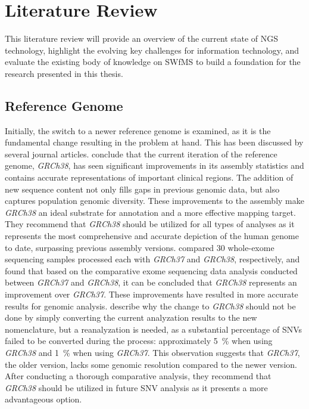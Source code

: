 \section{Literature Review}\label{sec:literature_review}

This literature review will provide an overview of the current state of \ac{NGS} technology, highlight the evolving key challenges for information technology, and evaluate the existing body of knowledge on \ac{SWfMS} to build a foundation for the research presented in this thesis.

\subsection{Reference Genome}
Initially, the switch to a newer reference genome is examined, as it is the fundamental change resulting in the problem at hand. This has been discussed by several journal articles. \citeauthor{Schneider2017} \autocite{Schneider2017} conclude that the current iteration of the reference genome, \textit{GRCh38}, has seen significant improvements in its assembly statistics and contains accurate representations of important clinical regions. The addition of new sequence content not only fills gaps in previous genomic data, but also captures population genomic diversity. These improvements to the assembly make \textit{GRCh38} an ideal substrate for annotation and a more effective mapping target. They recommend that \textit{GRCh38} should be utilized for all types of analyses as it represents the most comprehensive and accurate depiction of the human genome to date, surpassing previous assembly versions. \citeauthor{Guo2017} \autocite{Guo2017} compared 30 whole-exome sequencing samples processed each with \textit{GRCh37} and \textit{GRCh38}, respectively, and found that based on the comparative exome sequencing data analysis conducted between \textit{GRCh37} and \textit{GRCh38}, it can be concluded that \textit{GRCh38} represents an improvement over \textit{GRCh37}. These improvements have resulted in more accurate results for genomic analysis. \citeauthor{Pan2019} \autocite{Pan2019} describe why the change to \textit{GRCh38} should not be done by simply converting the current analyzation results to the new nomenclature, but a reanalyzation is needed, as a substantial percentage of \acp{SNV} failed to be converted during the process: approximately \SI{5}{\percent} when using \textit{GRCh38} and \SI{1}{\percent} when using \textit{GRCh37}. This observation suggests that \textit{GRCh37}, the older version, lacks some genomic resolution compared to the newer version. After conducting a thorough comparative analysis, they recommend that \textit{GRCh38} should be utilized in future SNV analysis as it presents a more advantageous option.

